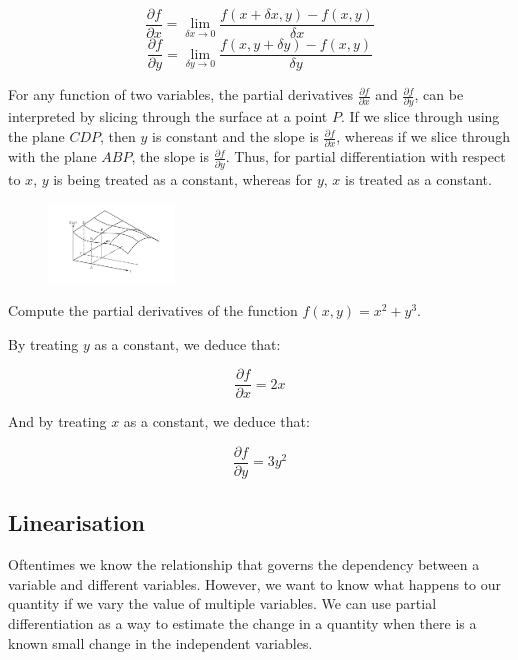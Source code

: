 \documentclass[12pt]{article}
\begin{document}
\[ \frac{\partial f}{\partial x} = \lim_{\delta x \to 0} \frac{f(x + \delta x, y) - f(x, y)}{\delta x} \]
\[ \frac{\partial f}{\partial y} = \lim_{\delta y \to 0} \frac{f(x, y + \delta y) - f(x, y)}{\delta y} \]

For any function of two variables, the partial derivatives $\frac{\partial f}{\partial x}$ and $\frac{\partial f}{\partial y}$, can be interpreted by slicing through the surface at a point $P$. If we slice through using the plane $CDP$, then $y$ is constant and the slope is $\frac{\partial f}{\partial x}$, whereas if we slice through with the plane $ABP$, the slope is $\frac{\partial f}{\partial y}$. Thus, for partial differentiation with respect to $x$, $y$ is being treated as a constant, whereas for $y$, $x$ is treated as a constant.

\begin{figure}[h]
    \centering
    \includegraphics[width = 0.3\textwidth]{images/ss2.png}
    \label{fig:enter-label}
\end{figure}

\begin{example}
    Compute the partial derivatives of the function $f(x, y) = x^2 + y^3$.

    By treating $y$ as a constant, we deduce that:

    \[ \frac{\partial f}{\partial x} = 2x \]

    And by treating $x$ as a constant, we deduce that:

    \[ \frac{\partial f}{\partial y} = 3y^2 \]
\end{example} 

\newpage

\subsection{Linearisation}

Oftentimes we know the relationship that governs the dependency between a variable and different variables. However, we want to know what happens to our quantity if we vary the value of multiple variables. We can use partial differentiation as a way to estimate the change in a quantity when there is a known small change in the independent variables.
\end{document}
